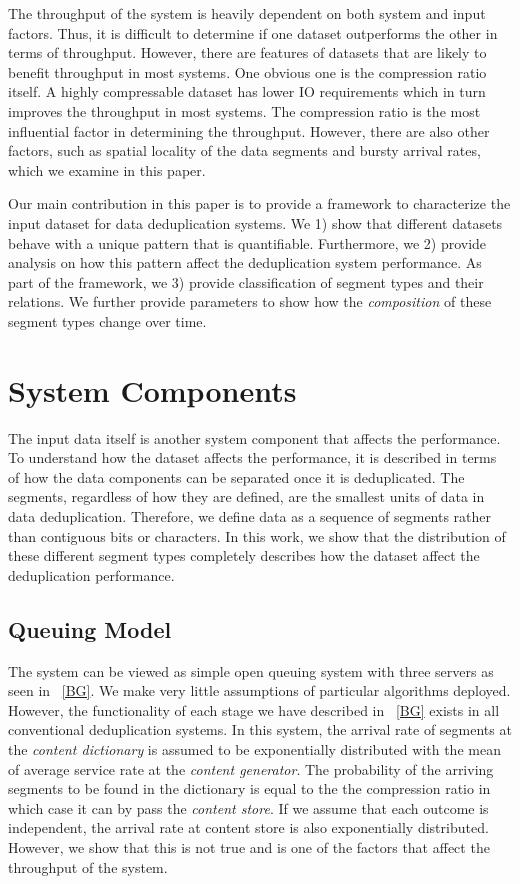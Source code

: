 The throughput of the system is heavily dependent on both system and input factors. Thus, it is difficult to determine if one dataset outperforms the other in terms of throughput. However, there are features of datasets that are likely to benefit throughput in most systems. One obvious one is the compression ratio itself. A highly compressable dataset has lower IO requirements which in turn improves the throughput in most systems. The compression ratio is the most influential factor in determining the throughput. However, there are also other factors, such as spatial locality of the data segments and bursty arrival rates, which we examine in this paper. 

Our main contribution in this paper is to provide a framework to characterize the input dataset for data deduplication systems. We 1) show that different datasets behave with a unique pattern that is quantifiable. Furthermore, we 2) provide analysis on how this pattern affect the deduplication system performance. As part of the framework, we 3) provide classification of segment types and their relations. We further provide parameters to show how the \emph{composition} of these segment types change over time. 

\section{System Components}\label{sys}
The input data itself is another system component that affects the performance. 
To understand how the dataset affects the performance, it is described in terms of how the data components can be separated once it is deduplicated. 
The segments, regardless of how they are defined, are the smallest units of data in data deduplication. 
Therefore, we define data as a sequence of segments rather than contiguous bits or characters. 
In this work, we show that the distribution of these different segment types completely describes how the dataset affect the deduplication performance.

\subsection{Queuing Model}
The system can be viewed as simple open queuing system with three servers as seen in \CHP~\ref{BG}. We make very little assumptions of particular algorithms deployed. However, the functionality of each stage we have described in \CHP~\ref{BG} exists in all conventional deduplication systems. 
In this system, the arrival rate of segments at the \emph{content dictionary} is assumed to be exponentially distributed with the mean of average service rate at the \emph{content generator}. The probability of the arriving segments to be found in the dictionary is equal to the the compression ratio in which case it can by pass the \emph{content store}. If we assume that each outcome is independent, the arrival rate at content store is also exponentially distributed. However, we show that this is not true and is one of the factors that affect the throughput of the system.  

